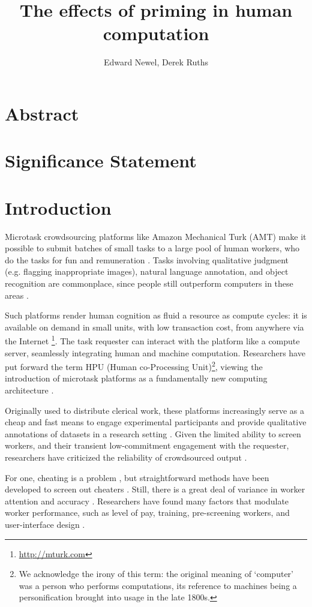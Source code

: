 \documentclass[a4paper]{report}
\title{The effects of priming in human computation}
\author{Edward Newel, Derek Ruths}
\begin{document}
\maketitle
\section*{Abstract}
\section*{Significance Statement}
\section*{Introduction}

Microtask crowdsourcing platforms like Amazon Mechanical Turk (AMT) make it 
possible to submit batches of small tasks to a large pool of human workers, 
who do the tasks for fun and remuneration \cite{kazai2013analysis}.  Tasks 
involving qualitative
judgment (e.g. flagging inappropriate images), natural language annotation,
and object recognition are commonplace, since people still outperform  
computers in these areas \cite{yuen2011survey}.

Such platforms render human cognition as fluid a resource as compute cycles: 
it is available on demand in small units, with low transaction cost, from 
anywhere via the Internet \footnote{\href{http://mturk.com}{http://mturk.com}}.
The task requester can interact with the platform like a compute server, 
seamlessly 
integrating human and machine computation.  Researchers have put forward the 
term HPU (Human co-Processing Unit)\footnote{We acknowledge the irony of this 
term: the original meaning of `computer' was a person who performs 
computations, its reference to machines being a personification brought into 
usage in the late 1800s\cite{Dictionary:hl}.}, viewing the introduction of 
microtask platforms as a fundamentally new computing architecture
\cite{5543192}.  

Originally used to distribute clerical work, these platforms 
increasingly serve as a cheap and fast means to engage experimental 
participants and provide qualitative annotations of datasets in a research 
setting \cite{snow2008cheap}.  Given the limited ability to screen workers, and their transient 
low-commitment engagement with the requester, researchers have criticized the
reliability of crowdsourced output \cite{marsden2009crowdsourcing}.  

For one, cheating
is a problem \cite{lease2011quality}, but straightforward methods have been 
developed to screen out cheaters \cite{snow2008cheap, kazai2013analysis}.
Still, there is a great deal of variance in worker attention and 
accuracy \cite{kazai2013analysis}.  Researchers have found many factors that 
modulate worker performance, such as level of pay\cite{kazai2013analysis}, 
training\cite{le2010ensuring}, pre-screening 
workers\cite{paolacci2010running}, and user-interface design
\cite{Finnerty2013}.
\end{document}
